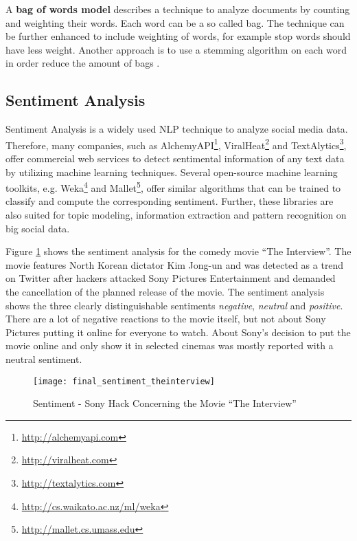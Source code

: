 A \textbf{bag of words model} describes a technique to analyze documents by counting and weighting their words. Each word can be a so called bag. The technique can be further enhanced to include weighting of words, for example stop words should have less weight. Another approach is to use a stemming algorithm on each word in order reduce the amount of bags \cite[117]{manning2008introduction}.


\subsection{Sentiment Analysis}
\label{subsec:sentiment-analysis}
Sentiment Analysis is a widely used NLP technique to analyze social media data. Therefore, many companies, such as AlchemyAPI\footnote{\url{http://alchemyapi.com} \accessednote}, ViralHeat\footnote{\url{http://viralheat.com} \accessednote} and TextAlytics\footnote{\url{http://textalytics.com} \accessednote}, offer commercial web services to detect sentimental information of any text data by utilizing machine learning techniques. Several open-source machine learning toolkits, e.g. Weka\footnote{\url{http://cs.waikato.ac.nz/ml/weka} \accessednote} and Mallet\footnote{\url{http://mallet.cs.umass.edu} \accessednote}, offer similar algorithms that can be trained to classify and compute the corresponding sentiment. Further, these libraries are also suited for topic modeling, information extraction and pattern recognition on big social data.

Figure \ref{fig:sentiment-interview} shows the sentiment analysis for the comedy movie \enquote{The Interview}. The movie features North Korean dictator Kim Jong-un and was detected as a trend on Twitter after hackers attacked Sony Pictures Entertainment and demanded the cancellation of the planned release of the movie. The sentiment analysis shows the three clearly distinguishable sentiments \textit{negative}, \textit{neutral} and \textit{positive}. There are a lot of negative reactions to the movie itself, but not about Sony Pictures putting it online for everyone to watch. About Sony's decision to put the movie online and only show it in selected cinemas was mostly reported with a neutral sentiment.

\begin{figure}[H]
  \centering
        \texttt{[image: final\_sentiment\_theinterview]}
  \caption[Sentiment - Sony Hack Concerning the Movie \enquote{The Interview}]{Sentiment - Sony Hack Concerning the Movie \enquote{The Interview}}
  \label{fig:sentiment-interview}
  \vspace{-1.3em}
\end{figure}

